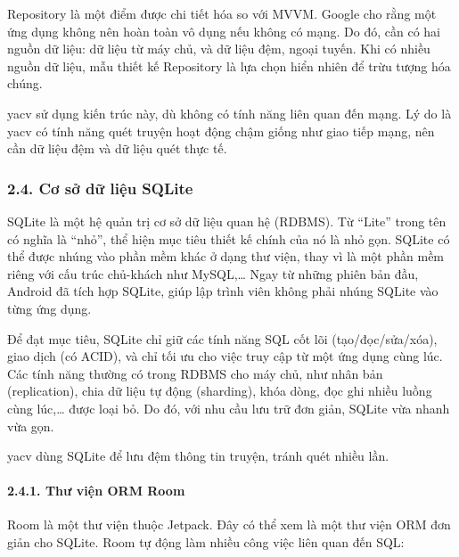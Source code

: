 \documentclass[
]{article}
\begin{document}
Repository là một điểm được chi tiết hóa so với MVVM. Google cho rằng
một ứng dụng không nên hoàn toàn vô dụng nếu không có mạng. Do đó, cần
có hai nguồn dữ liệu: dữ liệu từ máy chủ, và dữ liệu đệm, ngoại tuyến.
Khi có nhiều nguồn dữ liệu, mẫu thiết kế Repository là lựa chọn hiển
nhiên để trừu tượng hóa chúng.

yacv sử dụng kiến trúc này, dù không có tính năng liên quan đến mạng. Lý
do là yacv có tính năng quét truyện hoạt động chậm giống như giao tiếp
mạng, nên cần dữ liệu đệm và dữ liệu quét thực tế.

\hypertarget{cux1a1-sux1edf-dux1eef-liux1ec7u-sqlite}{%
\subsubsection{\texorpdfstring{2.4. Cơ sở dữ liệu SQLite
}{2.4. Cơ sở dữ liệu SQLite }}\label{cux1a1-sux1edf-dux1eef-liux1ec7u-sqlite}}

SQLite là một hệ quản trị cơ sở dữ liệu quan hệ (RDBMS). Từ ``Lite''
trong tên có nghĩa là ``nhỏ'', thể hiện mục tiêu thiết kế chính của nó
là nhỏ gọn. SQLite có thể được nhúng vào phần mềm khác ở dạng thư viện,
thay vì là một phần mềm riêng với cấu trúc chủ-khách như MySQL,\ldots{}
Ngay từ những phiên bản đầu, Android đã tích hợp SQLite, giúp lập trình
viên không phải nhúng SQLite vào từng ứng dụng.

Để đạt mục tiêu, SQLite chỉ giữ các tính năng SQL cốt lõi
(tạo/đọc/sửa/xóa), giao dịch (có ACID), và chỉ tối ưu cho việc truy cập
từ một ứng dụng cùng lúc. Các tính năng thường có trong RDBMS cho máy
chủ, như nhân bản (replication), chia dữ liệu tự động (sharding), khóa
dòng, đọc ghi nhiều luồng cùng lúc,\ldots{} được loại bỏ. Do đó, với nhu
cầu lưu trữ đơn giản, SQLite vừa nhanh vừa gọn.

yacv dùng SQLite để lưu đệm thông tin truyện, tránh quét nhiều lần.

\hypertarget{thux1b0-viux1ec7n-orm-room}{%
\paragraph{\texorpdfstring{2.4.1. Thư viện ORM Room
}{2.4.1. Thư viện ORM Room }}\label{thux1b0-viux1ec7n-orm-room}}

Room là một thư viện thuộc Jetpack. Đây có thể xem là một thư viện ORM
đơn giản cho SQLite. Room tự động làm nhiều công việc liên quan đến SQL:
\end{document}
